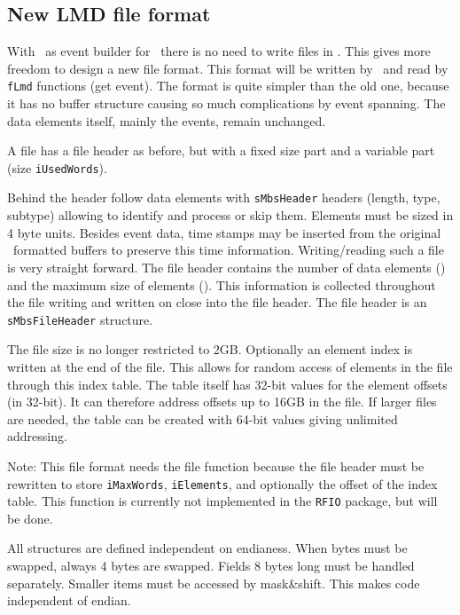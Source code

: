 \subsection{New LMD file format}
With \dabc\ as event builder for \mbs\ there is no need to write files in \mbs. This gives more freedom to design a new file format. This format will be written by \dabc\ and read by {\tt fLmd} functions (get event). The format is quite simpler than the old one, because it has no buffer structure causing so much complications by event spanning. The data elements itself, mainly the events, remain unchanged.

A file has a file header as before, but with a fixed size part and a variable part 
(size {\tt iUsedWords}).

Behind the header follow data elements with {\tt sMbsHeader} headers (length, type, subtype) allowing to identify and process or skip them. Elements must be sized in 4 byte units.
Besides event data, time stamps may be inserted from the original \mbs\ formatted buffers to preserve this time information. Writing/reading such a file is very straight forward. The file header contains the number of data elements () and the maximum size of elements (). This information is collected throughout the file writing and written on close into the file header. The file header is an {\tt sMbsFileHeader} structure.

The file size is no longer restricted to 2GB. Optionally an element index is written at the end of the file. This allows for random access of elements in the file through this index table. The table itself has 32-bit values for the element offsets (in 32-bit). It can therefore address offsets up to 16GB in the file. If larger files are needed, the table can be created with 64-bit values giving unlimited addressing.

Note: This file format needs the  file function because the file header must be rewritten to store {\tt iMaxWords}, {\tt iElements}, and optionally the offset of the index table. This function is currently not implemented in the {\tt RFIO} package, but will be done.

All structures are defined independent on endianess. When bytes must be swapped, always 4 bytes are swapped. Fields 8 bytes long must be handled separately.
Smaller items must be accessed by mask\&shift.
This makes code independent of endian.
